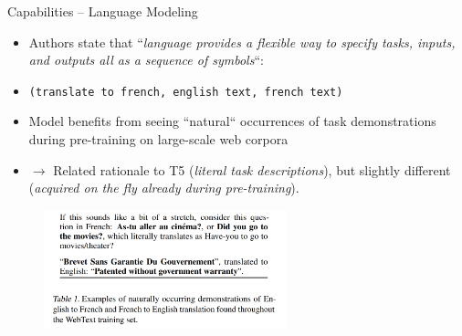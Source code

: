 \begin{frame}{Capabilities -- Language Modeling}

\vfill

\begin{itemize}
	\item Authors state that ``\textit{language provides a flexible way to specify tasks, inputs, and outputs all as a sequence of symbols}``:
	\item[] \texttt{(translate to french, english text, french text)}
	\item Model benefits from seeing ``natural`` occurrences of task demonstrations during pre-training on large-scale web corpora
	\item[] $\to$ Related rationale to T5 (\textit{literal task descriptions}), but slightly different (\textit{acquired on the fly already during pre-training}).
\end{itemize}

\begin{figure}
\centering
\includegraphics[width = 7cm]{figure/72-gpt2-demo-wild.png}\\ 
\end{figure}

\vfill

\end{frame}


